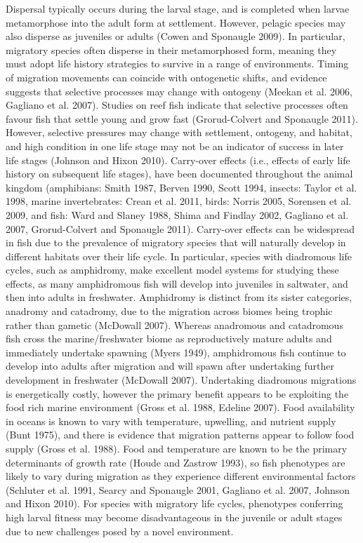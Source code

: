 \documentclass[]{book}
\begin{document}
Dispersal typically occurs during the larval stage, and is completed
when larvae metamorphose into the adult form at settlement. However,
pelagic species may also disperse as juveniles or adults (Cowen and
Sponaugle 2009). In particular, migratory species often disperse in
their metamorphosed form, meaning they must adopt life history
strategies to survive in a range of environments. Timing of migration
movements can coincide with ontogenetic shifts, and evidence suggests
that selective processes may change with ontogeny (Meekan et al. 2006,
Gagliano et al. 2007). Studies on reef fish indicate that selective
processes often favour fish that settle young and grow fast
(Grorud-Colvert and Sponaugle 2011). However, selective pressures may
change with settlement, ontogeny, and habitat, and high condition in one
life stage may not be an indicator of success in later life stages
(Johnson and Hixon 2010). Carry-over effects (i.e., effects of early
life history on subsequent life stages), have been documented throughout
the animal kingdom (amphibians: Smith 1987, Berven 1990, Scott 1994,
insects: Taylor et al. 1998, marine invertebrates: Crean et al. 2011,
birds: Norris 2005, Sorensen et al. 2009, and fish: Ward and Slaney
1988, Shima and Findlay 2002, Gagliano et al. 2007, Grorud-Colvert and
Sponaugle 2011). Carry-over effects can be widespread in fish due to the
prevalence of migratory species that will naturally develop in different
habitats over their life cycle. In particular, species with diadromous
life cycles, such as amphidromy, make excellent model systems for
studying these effects, as many amphidromous fish will develop into
juveniles in saltwater, and then into adults in freshwater. Amphidromy
is distinct from its sister categories, anadromy and catadromy, due to
the migration across biomes being trophic rather than gametic (McDowall
2007). Whereas anadromous and catadromous fish cross the
marine/freshwater biome as reproductively mature adults and immediately
undertake spawning (Myers 1949), amphidromous fish continue to develop
into adults after migration and will spawn after undertaking further
development in freshwater (McDowall 2007). Undertaking diadromous
migrations is energetically costly, however the primary benefit appears
to be exploiting the food rich marine environment (Gross et al. 1988,
Edeline 2007). Food availability in oceans is known to vary with
temperature, upwelling, and nutrient supply (Bunt 1975), and there is
evidence that migration patterns appear to follow food supply (Gross et
al. 1988). Food and temperature are known to be the primary determinants
of growth rate (Houde and Zastrow 1993), so fish phenotypes are likely
to vary during migration as they experience different environmental
factors (Schluter et al. 1991, Searcy and Sponaugle 2001, Gagliano et
al. 2007, Johnson and Hixon 2010). For species with migratory life
cycles, phenotypes conferring high larval fitness may become
disadvantageous in the juvenile or adult stages due to new challenges
posed by a novel environment.
\end{document}
